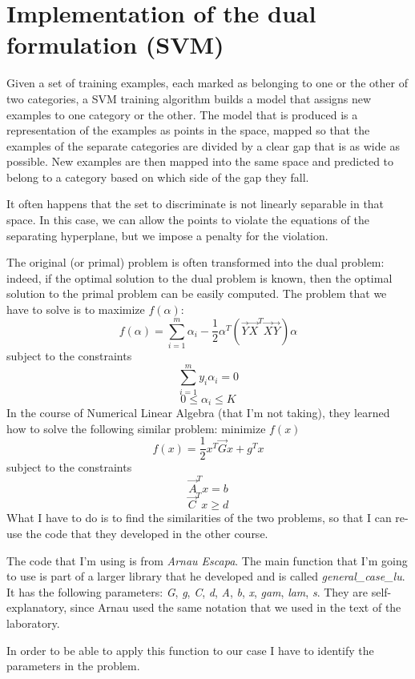 \section{Implementation of the dual formulation (SVM)}
    Given a set of training examples, each marked as belonging to one or the other of two categories, a SVM training algorithm builds a model that assigns new examples to one category or the other. The model that is produced is a representation of the examples as points in the space, mapped so that the examples of the separate categories are divided by a clear gap that is as wide as possible. New examples are then mapped into the same space and predicted to belong to a category based on which side of the gap they fall.\par
    It often happens that the set to discriminate is not linearly separable in that space. In this case, we can allow the points to violate the equations of the separating hyperplane, but we impose a penalty for the violation.\par
    The original (or primal) problem is often transformed into the dual problem: indeed, if the optimal solution to the dual problem is known, then the optimal solution to the primal problem can be easily computed. The problem that we have to solve is to maximize \(f(\alpha)\):
    \[f(\alpha) = \sum_{i=1}^{m}\alpha_i - \frac{1}{2}\alpha^T(\vec{Y}\vec{X}^T\vec{X}\vec{Y})\alpha\]
    subject to the constraints
    \[\sum_{i=1}^{m}y_i\alpha_i=0\]
    \[0\leq\alpha_i\leq K\]
    In the course of Numerical Linear Algebra (that I'm not taking), they learned how to solve the following similar problem: minimize \(f(x)\)
    \[f(x)=\frac{1}{2}x^T\vec{G}x + g^Tx\]
    subject to the constraints
    \[\vec{A}^Tx=b\]
    \[\vec{C}^Tx\geq d\]
    What I have to do is to find the similarities of the two problems, so that I can re-use the code that they developed in the other course.\par
    The code that I'm using is from \emph{Arnau Escapa}. The main function that I'm going to use is part of a larger library that he developed and is called \emph{general\_case\_lu}. It has the following parameters: \emph{G}, \emph{g}, \emph{C}, \emph{d}, \emph{A}, \emph{b}, \emph{x}, \emph{gam}, \emph{lam}, \emph{s}. They are self-explanatory, since Arnau used the same notation that we used in the text of the laboratory.\par
    In order to be able to apply this function to our case I have to identify the parameters in the problem.

